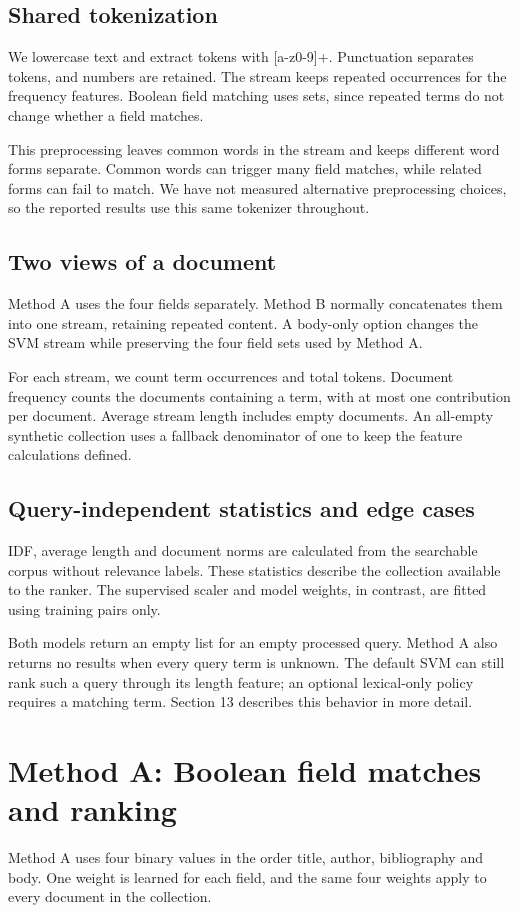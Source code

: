 \documentclass[12pt,a4paper]{article}
\begin{document}
\subsection{Shared tokenization}
We lowercase text and extract tokens with [a-z0-9]+. Punctuation separates tokens, and numbers are retained. The stream keeps repeated occurrences for the frequency features. Boolean field matching uses sets, since repeated terms do not change whether a field matches.

This preprocessing leaves common words in the stream and keeps different word forms separate. Common words can trigger many field matches, while related forms can fail to match. We have not measured alternative preprocessing choices, so the reported results use this same tokenizer throughout.

\subsection{Two views of a document}
Method A uses the four fields separately. Method B normally concatenates them into one stream, retaining repeated content. A body-only option changes the SVM stream while preserving the four field sets used by Method A.

For each stream, we count term occurrences and total tokens. Document frequency counts the documents containing a term, with at most one contribution per document. Average stream length includes empty documents. An all-empty synthetic collection uses a fallback denominator of one to keep the feature calculations defined.

\subsection{Query-independent statistics and edge cases}
IDF, average length and document norms are calculated from the searchable corpus without relevance labels. These statistics describe the collection available to the ranker. The supervised scaler and model weights, in contrast, are fitted using training pairs only.

Both models return an empty list for an empty processed query. Method A also returns no results when every query term is unknown. The default SVM can still rank such a query through its length feature; an optional lexical-only policy requires a matching term. Section 13 describes this behavior in more detail.

\section{Method A: Boolean field matches and ranking}
Method A uses four binary values in the order title, author, bibliography and body. One weight is learned for each field, and the same four weights apply to every document in the collection.
\end{document}
